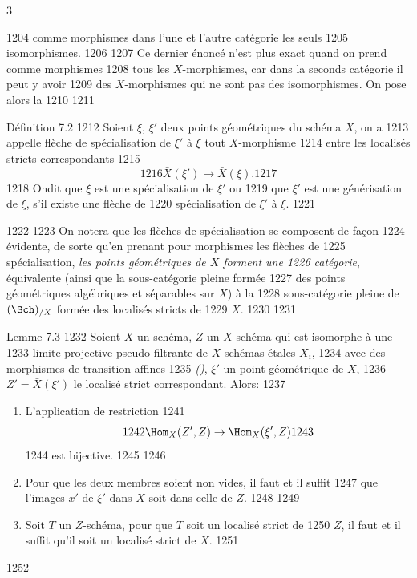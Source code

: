 3	\documentclass[10pt]{../fichiers-configuration-latex/smfart}
\begin{document}
  1204	comme morphismes dans l'une et l'autre catégorie les seuls
  1205	isomorphismes.
  1206	
  1207	Ce dernier énoncé n'est plus exact quand on prend comme morphismes
  1208	tous les $X$-morphismes, car dans la seconds catégorie il peut y avoir
  1209	des $X$-morphismes qui ne sont pas des isomorphismes. On pose alors la
  1210	
  1211	\begin{enonce*}{Définition 7.2}
  1212	Soient $\xi$, $\xi'$ deux points géométriques du schéma $X$, on a
  1213	appelle flèche de spécialisation de $\xi'$ à $\xi$ tout $X$-morphisme
  1214	entre les localisés stricts correspondants
  1215	$$
  1216	\bar{X} (\xi') \to \bar{X} (\xi).
  1217	$$
  1218	On\pageoriginale dit que $\xi$ est une spécialisation de $\xi'$ ou
  1219	que $\xi'$ est une générisation de $\xi$, s'il existe une flèche de
  1220	spécialisation de $\xi'$ à $\xi$.
  1221	\end{enonce*}
  1222	
  1223	On notera que les flèches de spécialisation se composent de façon
  1224	évidente, de sorte qu'en prenant pour morphismes les flèches de
  1225	spécialisation, \emph{les points géométriques de $X$ forment une
  1226	  catégorie}, équivalente (ainsi que la sous-catégorie pleine formée
  1227	des points géométriques algébriques et séparables sur $X$) à la
  1228	sous-catégorie pleine de $(\Sch)_{/X}$ formée des localisés stricts de
  1229	$X$.
  1230	
  1231	\begin{enonce*}{Lemme 7.3}
  1232	Soient $X$ un schéma, $Z$ un $X$-schéma qui est isomorphe à une
  1233	limite projective pseudo-filtrante de $X$-schémas étales $X_{i}$,
  1234	avec des morphismes de transition affines
  1235	\emph{()}, $\xi'$ un point géométrique de $X$,
  1236	$Z' = \bar{X} (\xi')$ le localisé strict correspondant. Alors:
  1237	\begin{enumerate}
  1238	\renewcommand{\theenumi}{\alph{enumi}}
  1239	\renewcommand{\labelenumi}{\theenumi)}
  1240	\item L'application de restriction
  1241	$$
  1242	\Hom_X (Z', Z) \to \Hom_X(\xi', Z)
  1243	$$
  1244	est bijective.
  1245	
  1246	\item Pour que les deux membres soient non vides, il faut et il suffit
  1247	  que l'images $x'$ de $\xi'$ dans $X$ soit dans celle de $Z$.
  1248	
  1249	\item Soit $T$ un $Z$-schéma, pour que $T$ soit un localisé strict de
  1250	  $Z$, il faut et il suffit qu'il soit un localisé strict de $X$.
  1251	\end{enumerate}
  1252	\end{enonce*}
\end{document}
